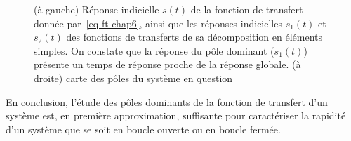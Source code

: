 \begin{figure}[!h]
\centering
\caption{(à gauche) Réponse indicielle $s(t)$ de la fonction de 
         transfert donnée par~\cref{eq-ft-chap6}, ainsi que les réponses 
         indicielles $s_1(t)$ et $s_2(t)$ des fonctions de transferts de 
         sa décomposition en éléments simples. On constate que la réponse 
         du pôle dominant ($s_1(t)$) présente un temps de réponse proche 
         de la réponse globale. (à droite) carte des pôles du système en 
         question\label{fig-poles_dominants}}
\end{figure}

En conclusion, l'étude des pôles dominants de la fonction de transfert 
d'un système est, en première approximation, suffisante pour caractériser 
la rapidité d'un système que se soit en boucle ouverte ou en boucle fermée.

